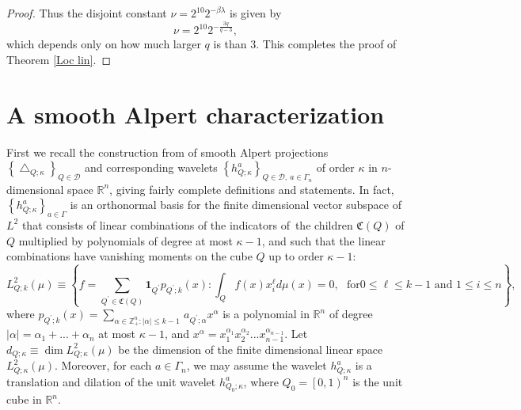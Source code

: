 \documentclass{amsart}%
\theoremstyle{plain}
\numberwithin{equation}{section}
\begin{document}
\begin{proof}
Thus the disjoint constant $\nu=2^{10}2^{-\beta\lambda}$ is given by
\begin{equation}
\nu=2^{10}2^{-\frac{3q}{q-3}},\label{nu}%
\end{equation}
which depends only on how much larger $q$ is than $3$. This completes the
proof of Theorem \ref{Loc lin}.
\end{proof}

\section{A smooth Alpert characterization}

First we recall the construction from \cite{Saw7} of smooth Alpert projections
$\left\{  \bigtriangleup_{Q;\kappa}\right\}  _{Q\in\mathcal{D}}$ and
corresponding wavelets $\left\{  h_{Q;\kappa}^{a}\right\}  _{Q\in
\mathcal{D},\ a\in\Gamma_{n}}$ of order $\kappa$ in $n$-dimensional space
$\mathbb{R}^{n}$, giving fairly complete definitions and statements. In fact,
$\left\{  h_{Q;\kappa}^{a}\right\}  _{a\in\Gamma}$ is an orthonormal basis for
the finite dimensional vector subspace of $L^{2}$ that consists of linear
combinations of the indicators of\ the children $\mathfrak{C}\left(  Q\right)
$ of $Q$ multiplied by polynomials of degree at most $\kappa-1$, and such that
the linear combinations have vanishing moments on the cube $Q$ up to order
$\kappa-1$:%
\[
L_{Q;k}^{2}\left(  \mu\right)  \equiv\left\{
f=\mathop{\displaystyle \sum }\limits_{Q^{\prime}\in\mathfrak{C}\left(
Q\right)  }\mathbf{1}_{Q^{\prime}}p_{Q^{\prime};k}\left(  x\right)  :\int
_{Q}f\left(  x\right)  x_{i}^{\ell}d\mu\left(  x\right)  =0,\ \ \ \text{for
}0\leq\ell\leq k-1\text{ and }1\leq i\leq n\right\}  ,
\]
where $p_{Q^{\prime};k}\left(  x\right)  =\sum_{\alpha\in\mathbb{Z}_{+}%
^{n}:\left\vert \alpha\right\vert \leq k-1\ }a_{Q^{\prime};\alpha}x^{\alpha}$
is a polynomial in $\mathbb{R}^{n}$ of degree $\left\vert \alpha\right\vert
=\alpha_{1}+...+\alpha_{n}$ at most $\kappa-1$, and $x^{\alpha}=x_{1}%
^{\alpha_{1}}x_{2}^{\alpha_{2}}...x_{n-1}^{\alpha_{n-1}}$. Let $d_{Q;\kappa
}\equiv\dim L_{Q;\kappa}^{2}\left(  \mu\right)  $ be the dimension of the
finite dimensional linear space $L_{Q;\kappa}^{2}\left(  \mu\right)  $.
Moreover, for each $a\in\Gamma_{n}$, we may assume the wavelet $h_{Q;\kappa
}^{a}$ is a translation and dilation of the unit wavelet $h_{Q_{0};\kappa}%
^{a}$, where $Q_{0}=\left[  0,1\right)  ^{n}$ is the unit cube in
$\mathbb{R}^{n}$.
\end{document}
